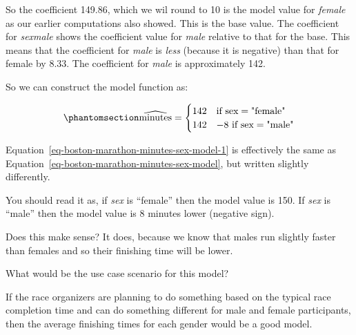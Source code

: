 \documentclass[
  12pt,
  letterpaper,
  DIV=11,
  numbers=noendperiod]{scrreprt}
\begin{document}
So the coefficient 149.86, which we wil round to 10 is the model value
for \emph{female} as our earlier computations also showed. This is the
base value. The coefficient for \emph{sexmale} shows the coefficient
value for \emph{male} relative to that for the base. This means that the
coefficient for \emph{male} is \emph{less} (because it is negative) than
that for female by 8.33. The coefficient for \emph{male} is
approximately 142.

So we can construct the model function as:

\begin{equation}\phantomsection\label{eq-boston-marathon-minutes-sex-model-1}{
\widehat{\text{minutes}} =
\begin{cases}
142 & \text{if } \text{sex} = \text{"female"} \\
142 & - 8\,\, \text{if } \text{sex} = \text{"male"}
\end{cases}
}\end{equation}

Equation~\ref{eq-boston-marathon-minutes-sex-model-1} is effectively the
same as Equation~\ref{eq-boston-marathon-minutes-sex-model}, but written
slightly differently.

You should read it as, if \emph{sex} is ``female'' then the model value
is 150. If \emph{sex} is ``male'' then the model value is 8 minutes
lower (negative sign).

Does this make sense? It does, because we know that males run slightly
faster than females and so their finishing time will be lower.

\begin{tcolorbox}[enhanced jigsaw, colback=white, leftrule=.75mm, toprule=.15mm, bottomtitle=1mm, breakable, coltitle=black, toptitle=1mm, title={Quick Check}, opacitybacktitle=0.6, colbacktitle=quarto-callout-note-color!10!white, arc=.35mm, left=2mm, colframe=quarto-callout-note-color-frame, titlerule=0mm, rightrule=.15mm, bottomrule=.15mm, opacityback=0]

What would be the use case scenario for this model?

\end{tcolorbox}

\begin{tcolorbox}[enhanced jigsaw, colback=white, leftrule=.75mm, toprule=.15mm, bottomtitle=1mm, breakable, coltitle=black, toptitle=1mm, title={Suggested answer}, opacitybacktitle=0.6, colbacktitle=quarto-callout-note-color!10!white, arc=.35mm, left=2mm, colframe=quarto-callout-note-color-frame, titlerule=0mm, rightrule=.15mm, bottomrule=.15mm, opacityback=0]

If the race organizers are planning to do something based on the typical
race completion time and can do something different for male and female
participants, then the average finishing times for each gender would be
a good model.

\end{tcolorbox}
\end{document}
